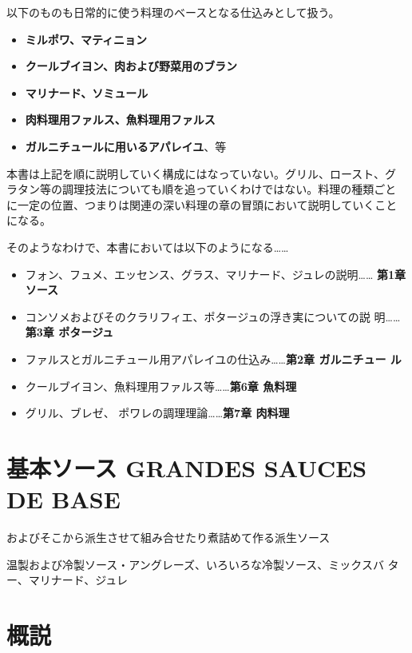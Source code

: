 \documentclass[twoside,12Q,b5paper,tombo]{escoffierltjsbook}
\def\tightlist{\itemsep1pt\parskip0pt\parsep0pt}
\begin{document}
以下のものも日常的に使う料理のベースとなる仕込みとして扱う。

\begin{itemize}
\tightlist
\item
  \textbf{ミルポワ、マティニョン}
\item
  \textbf{クールブイヨン、肉および野菜用のブラン}
\item
  \textbf{マリナード、ソミュール}
\item
  \textbf{肉料理用ファルス、魚料理用ファルス}
\item
  \textbf{ガルニチュールに用いるアパレイユ}、等
\end{itemize}

本書は上記を順に説明していく構成にはなっていない。グリル、ロースト、グ
ラタン等の調理技法についても順を追っていくわけではない。料理の種類ごと
に一定の位置、つまりは関連の深い料理の章の冒頭において説明していくこと
になる。

そのようなわけで、本書においては以下のようになる\ldots{}\ldots{}

\begin{itemize}
\tightlist
\item
  フォン、フュメ、エッセンス、グラス、マリナード、ジュレの説明\ldots{}\ldots{}
  \textbf{ 第1章 ソース}
\item
  コンソメおよびそのクラリフィエ、ポタージュの浮き実についての説
  明\ldots{}\ldots{}\textbf{第3章 ポタージュ}
\item
  ファルスとガルニチュール用アパレイユの仕込み\ldots{}\ldots{}\textbf{第2章
  ガルニチュー ル}
\item
  クールブイヨン、魚料理用ファルス等\ldots{}\ldots{}\textbf{第6章
  魚料理}
\item
  グリル、ブレゼ、 ポワレの調理理論\ldots{}\ldots{}\textbf{第7章 肉料理}
\end{itemize}

\newpage

\section{基本ソース GRANDES SAUCES DE
BASE}\label{ux57faux672cux30bdux30fcux30b9-grandes-sauces-de-base}

およびそこから派生させて組み合せたり煮詰めて作る派生ソース

温製および冷製ソース・アングレーズ、いろいろな冷製ソース、ミックスバ
ター、マリナード、ジュレ

\section{概説}\label{ux6982ux8aac}
\end{document}
